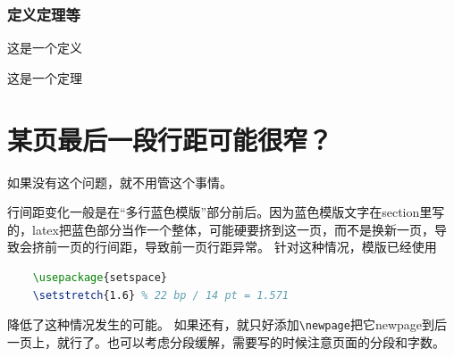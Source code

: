 \begin{refsection}
\subsubsection{定义定理等}
\begin{definition}
这是一个定义
\end{definition}
\begin{theorem}
	这是一个定理
\end{theorem}

\section{某页最后一段行距可能很窄？}
如果没有这个问题，就不用管这个事情。

行间距变化一般是在“多行蓝色模版”部分前后。因为蓝色模版文字在section里写的，latex把蓝色部分当作一个整体，可能硬要挤到这一页，而不是换新一页，导致会挤前一页的行间距，导致前一页行距异常。
针对这种情况，模版已经使用
\begin{lstlisting}[language=tex, basicstyle=\ttfamily\small, keywordstyle=\color{blue}, commentstyle=\color{gray}]
	%自动段落的行间距微调
	\usepackage{setspace}
	\setstretch{1.6} % 22 bp / 14 pt = 1.571
\end{lstlisting}
降低了这种情况发生的可能。
如果还有，就只好添加\verb|\newpage|把它newpage到后一页上，就行了。也可以考虑分段缓解，需要写的时候注意页面的分段和字数。


\end{refsection}

\newpage%
